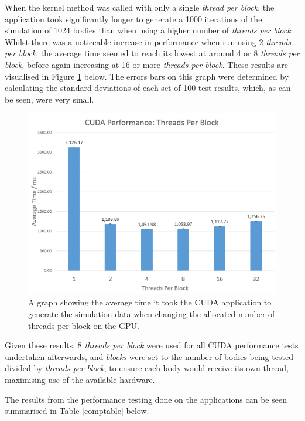 \documentclass[12pt,journal,transmag]{IEEEtran}
\begin{document}
	When the kernel method was called with only a single \textit{thread per block}, the application took significantly longer to generate a 1000 iterations of the simulation of 1024 bodies than when using a higher number of  \textit{threads per block}. Whilst there was a noticeable increase in performance when run using 2 \textit{threads per block}, the average time seemed to reach its lowest at around 4 or 8 \textit{threads per block}, before again increasing at 16 or more \textit{threads per block}. These results are visualised in Figure \ref{graph1} below. The errors bars on this graph were determined by calculating the standard deviations of each set of 100 test results, which, as can be seen, were very small.

	\begin{figure}[!h]
		\centering
		\includegraphics[width=1.5\columnwidth]{IMAGES/cudathreads}
		\caption{A graph showing the average time it took the CUDA application to generate the simulation data when changing the allocated number of threads per block on the GPU.}
		\label{graph1}
	\end{figure}

	Given these results, 8 \textit{threads per block} were used for all CUDA performance tests undertaken afterwards, and \textit{blocks} were set to the number of bodies being tested divided by \textit{threads per block}, to ensure each body would receive its own thread, maximising use of the available hardware.
	
	The results from the performance testing done on the applications can be seen summarised in Table \ref{comptable} below. 
\end{document}
